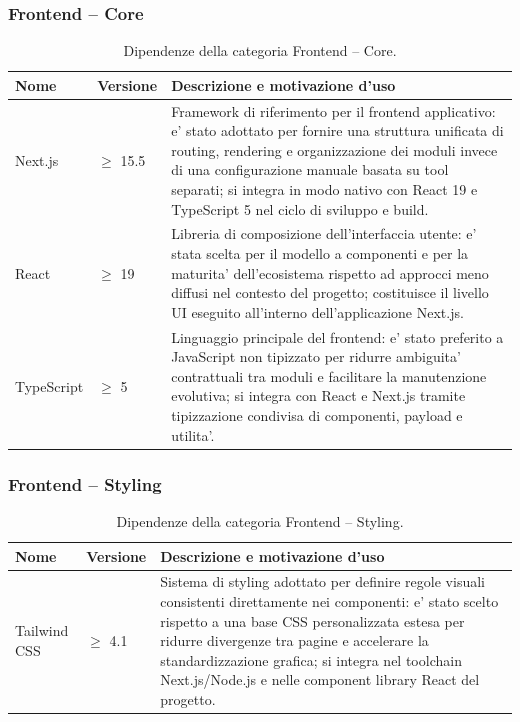 \documentclass[a4paper, 11pt, oneside]{scrartcl}
\begin{document}
\subsubsection{Frontend -- Core}
\begin{table}[H]
    \centering
    \renewcommand{\arraystretch}{1.2}
    \begin{tabularx}{\textwidth}{@{}l l X@{}}
        \toprule
        \textbf{Nome} & \textbf{Versione} & \textbf{Descrizione e motivazione d'uso} \\
        \midrule
        Next.js & $\geq$ 15.5 & Framework di riferimento per il frontend applicativo: e' stato adottato per fornire una struttura unificata di routing, rendering e organizzazione dei moduli invece di una configurazione manuale basata su tool separati; si integra in modo nativo con React 19 e TypeScript 5 nel ciclo di sviluppo e build. \\
        React & $\geq$ 19 & Libreria di composizione dell'interfaccia utente: e' stata scelta per il modello a componenti e per la maturita' dell'ecosistema rispetto ad approcci meno diffusi nel contesto del progetto; costituisce il livello UI eseguito all'interno dell'applicazione Next.js. \\
        TypeScript & $\geq$ 5 & Linguaggio principale del frontend: e' stato preferito a JavaScript non tipizzato per ridurre ambiguita' contrattuali tra moduli e facilitare la manutenzione evolutiva; si integra con React e Next.js tramite tipizzazione condivisa di componenti, payload e utilita'. \\
        \bottomrule
    \end{tabularx}
    \caption{Dipendenze della categoria Frontend -- Core.}
    \label{tab:dip_frontend_core}
\end{table}

\subsubsection{Frontend -- Styling}
\begin{table}[H]
    \centering
    \renewcommand{\arraystretch}{1.2}
    \begin{tabularx}{\textwidth}{@{}l l X@{}}
        \toprule
        \textbf{Nome} & \textbf{Versione} & \textbf{Descrizione e motivazione d'uso} \\
        \midrule
        Tailwind CSS & $\geq$ 4.1 & Sistema di styling adottato per definire regole visuali consistenti direttamente nei componenti: e' stato scelto rispetto a una base CSS personalizzata estesa per ridurre divergenze tra pagine e accelerare la standardizzazione grafica; si integra nel toolchain Next.js/Node.js e nelle component library React del progetto. \\
        \bottomrule
    \end{tabularx}
    \caption{Dipendenze della categoria Frontend -- Styling.}
    \label{tab:dip_frontend_styling}
\end{table}
\end{document}
